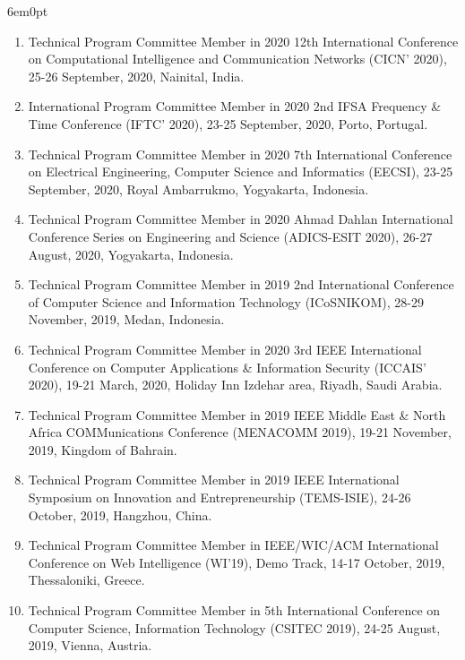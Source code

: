 \documentclass[11pt,a4paper]{moderncv}
\begin{document}
\begin{adjustwidth}{6em}{0pt}
\begin{enumerate}
		\item Technical Program Committee Member in 2020 12th International Conference on Computational Intelligence and Communication Networks (CICN' 2020), 25-26 September, 2020, Nainital, India.
		
		\item International Program Committee Member in 2020 2nd IFSA Frequency \& Time Conference (IFTC' 2020), 23-25 September, 2020, Porto, Portugal.
		
		\item Technical Program Committee Member in 2020 7th International Conference on Electrical Engineering, Computer Science and Informatics (EECSI), 23-25 September, 2020, Royal Ambarrukmo, Yogyakarta, Indonesia.
		
		\item Technical Program Committee Member in 2020 Ahmad Dahlan International Conference Series on Engineering and Science (ADICS-ESIT 2020), 26-27 August, 2020, Yogyakarta, Indonesia.
		
		\item Technical Program Committee Member in 2019 2nd International Conference of Computer Science and Information Technology (ICoSNIKOM), 28-29 November, 2019, Medan, Indonesia.
		
		\item Technical Program Committee Member in 2020 3rd IEEE International Conference on Computer Applications \& Information Security (ICCAIS’ 2020), 19-21 March, 2020, Holiday Inn Izdehar area, Riyadh, Saudi Arabia.
		
		\item Technical Program Committee Member in 2019 IEEE Middle East \& North Africa COMMunications Conference (MENACOMM 2019), 19-21 November, 2019, Kingdom of Bahrain.
		
		\item Technical Program Committee Member in 2019 IEEE International Symposium on Innovation and Entrepreneurship (TEMS-ISIE), 24-26 October, 2019, Hangzhou, China.
		
		\item Technical Program Committee Member in IEEE/WIC/ACM International Conference on Web Intelligence (WI'19), Demo Track, 14-17 October, 2019, Thessaloniki, Greece.
		
		\item Technical Program Committee Member in 5th International Conference on Computer Science, Information Technology (CSITEC 2019), 24-25 August, 2019, Vienna, Austria.
		

\end{enumerate}
\end{adjustwidth}
\end{document}
